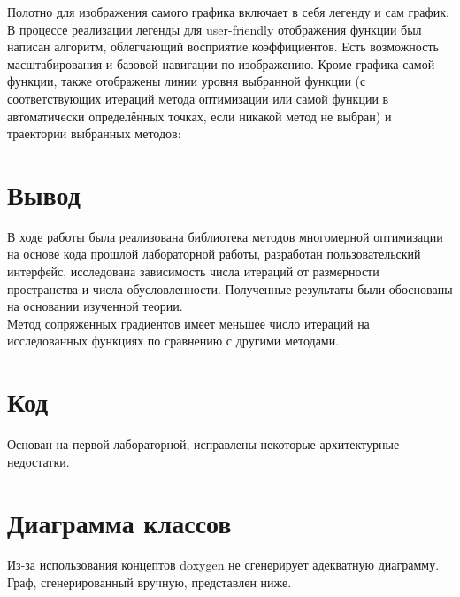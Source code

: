 \documentclass[russian, english]{article}
\begin{document}
Полотно для изображения самого графика включает в себя легенду и сам график. В процессе реализации легенды для user-friendly отображения функции был написан алгоритм, облегчающий восприятие коэффициентов. Есть возможность масштабирования и базовой навигации по изображению. Кроме графика самой функции, также отображены линии уровня выбранной функции (с соответствующих итераций метода оптимизации или самой функции в автоматически определённых точках, если никакой метод не выбран) и траектории выбранных методов:\\
\noindent{}

\newpage
\section{Вывод}
В ходе работы была реализована библиотека методов многомерной оптимизации на основе кода прошлой лабораторной работы, разработан пользовательский интерфейс, исследована зависимость числа итераций от размерности пространства и числа обусловленности. Полученные результаты были обоснованы на основании изученной теории. \\
Метод сопряженных градиентов имеет меньшее число итераций на исследованных функциях по сравнению с другими методами.

\appendix
\section{Код}
Основан на первой лабораторной, исправлены некоторые архитектурные недостатки.

\section{Диаграмма классов}
Из-за использования концептов doxygen не сгенерирует адекватную диаграмму. Граф, сгенерированный вручную, представлен ниже. \\
\noindent{}
%
\end{document}
